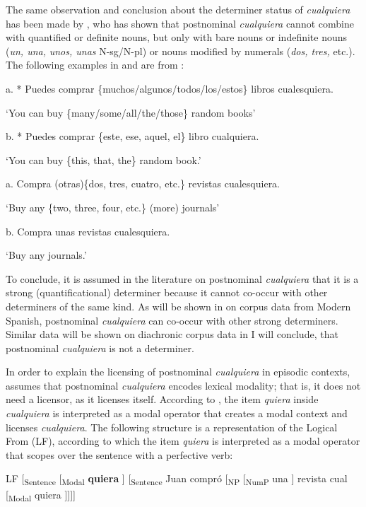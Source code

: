   The same observation and conclusion about the determiner status of \textit{cualquiera} has been made by \citet{Rivero2011}, who has shown that postnominal \textit{cualquiera} cannot combine with quantified or definite nouns, but only with bare nouns or indefinite nouns (\textit{un, una,} \textit{unos, unas} N-sg/N-pl) or nouns modified by numerals (\textit{dos, tres,} etc.). The following examples in  and  are from \citet[72]{Rivero2011}:

\label{bkm:Ref63458156}  a.  * Puedes comprar \{muchos/algunos/todos/los/estos\} libros cualesquiera.

    ‘You can buy \{many/some/all/the/those\} random books’

  b.  * Puedes comprar \{este, ese, aquel, el\} libro cualquiera.

    ‘You can buy \{this, that, the\} random book.’

\label{bkm:Ref533762162}  a.  Compra (otras)\{dos, tres, cuatro, etc.\} revistas cualesquiera.

    ‘Buy any \{two, three, four, etc.\} (more) journals’

  b.  Compra unas revistas cualesquiera.

    ‘Buy any journals.’

To conclude, it is assumed in the literature on postnominal \textit{cualquiera} that it is a strong (quantificational) determiner because it cannot co-occur with other determiners of the same kind. As will be shown in  on corpus data from Modern Spanish, postnominal \textit{cualquiera} can co-occur with other strong determiners. Similar data will be shown on diachronic corpus data in  I will conclude, that postnominal \textit{cualquiera} is not a determiner. 

  In order to explain the licensing of postnominal \textit{cualquiera} in episodic contexts, \citet{Rivero2011} assumes that postnominal \textit{cualquiera} encodes lexical modality; that is, it does not need a licensor, as it licenses itself. According to \citet{Rivero2011}, the item \textit{quiera} inside \textit{cualquiera} is interpreted as a modal operator that creates a modal context and licenses \textit{cualquiera}. The following structure is a representation of the Logical From (LF), according to which the item \textit{quiera} is interpreted as a modal operator that scopes over the sentence with a perfective verb:

  LF [\textsubscript{Sentence} [\textsubscript{Modal} \textbf{quiera} ] [\textsubscript{Sentence} Juan compró [\textsubscript{NP} [\textsubscript{NumP} una ] revista cual [\textsubscript{Modal} quiera ]]]]

